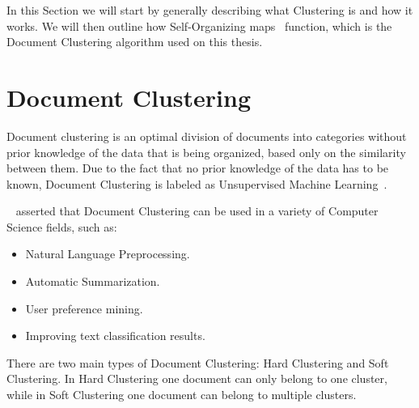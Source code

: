 
In this Section we will start by generally describing what Clustering is and how it works. We will then outline how Self-Organizing maps~\cite{Kohonen1990} function, which is the Document Clustering algorithm used on this thesis.

\section{Document Clustering}
\label{sec:clustering}
Document clustering is an optimal division of documents into categories without prior knowledge of the data that is being organized, based only on the similarity between them. Due to the fact that no prior knowledge of the data has to be known, Document Clustering is labeled as Unsupervised Machine Learning~\cite{hinton1999unsupervised}.

~\citet{Liu2012b} asserted that Document Clustering can be used in a variety of Computer Science fields, such as:
\begin{itemize}
  \item Natural Language Preprocessing.
  \item Automatic Summarization.
  \item User preference mining.
  \item Improving text classification results.
\end{itemize}

There are two main types of Document Clustering: Hard Clustering and Soft Clustering. In Hard Clustering one document can only belong to one cluster, while in Soft Clustering one document can belong to multiple clusters. 


